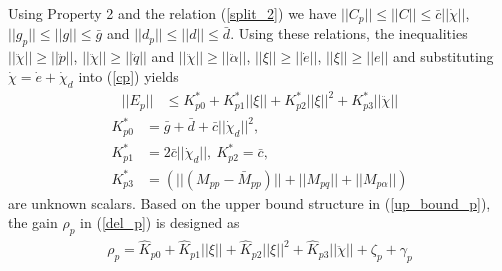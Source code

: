 \documentclass[letterpaper, 10 pt, conference]{ieeeconf}  %
\begin{document}
Using Property 2 and the relation (\ref{split_2}) we have $||C_{p}|| \leq ||C|| \leq \bar{c}||\dot{\chi}||$, $||g_{p}|| \leq ||g|| \leq \bar{g}$ and $||d_{p}|| \leq ||d|| \leq \bar{d}$. Using these relations, the inequalities $||\ddot{\chi}|| \geq ||\ddot{p}||$, $||\ddot{\chi}|| \geq ||\ddot{q}||$ and $||\ddot{\chi}|| \geq ||\ddot{\alpha}||$, $||\xi|| \geq ||\dot{e}||$, $||\xi|| \geq ||{e}||$ and substituting $\dot{\chi} = \dot{e} + \dot{\chi}_d$ into (\ref{cp}) yields
\begin{align} 
||E_{p}|| &\leq K_{p0}^*  +K_{p1}^*||\xi||+ K_{p2}^*||\xi||^2 + K_{p3}^*||\ddot{\chi}||\label{up_bound_p} 
\end{align}
\begin{align*}
 K_{p0}^* &= \bar{g} + \bar{d} + \bar{c}||\dot{\chi}_d||^2,\\
K_{p1}^* &= 2\bar{c}|| \dot{\chi}_d||,~
K_{p2}^* = \bar{c}, \\
K_{p3}^* &=  (||(M_{pp} - \bar{M}_{pp} )||+ ||M_{pq}|| + ||M_{p\alpha}||)
\end{align*}
are unknown scalars. Based on the upper bound structure in (\ref{up_bound_p}), the gain $\rho_{p}$ in (\ref{del_p}) is designed as
\begin{align}
\rho_{p} = \hat{K}_{p0} + \hat{K}_{p1}||\xi|| + \hat{K}_{p2}||\xi||^2 + \hat{K}_{p3}||\ddot{\chi}|| + \zeta_{p} + \gamma_{p} \label{rho_p} 
\end{align}
\end{document}
